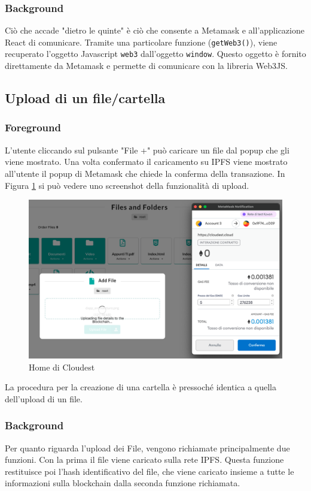\documentclass{article}
\begin{document}
\subsubsection{Background}
Ciò che accade "dietro le quinte" è ciò che consente a Metamask e all'applicazione React di comunicare. Tramite una particolare funzione (\texttt{getWeb3()}), viene recuperato l'oggetto Javascript \texttt{web3} dall'oggetto \texttt{window}. Questo oggetto è fornito direttamente da Metamask e permette di comunicare con la libreria Web3JS.

\subsection{Upload di un file/cartella}
\subsubsection{Foreground}
L'utente cliccando sul pulsante "File +" può caricare un file dal popup che gli viene mostrato. Una volta confermato il caricamento su IPFS viene mostrato all'utente il popup di Metamask che chiede la conferma della transazione. In Figura \ref{fig:fileupload} si può vedere uno screenshot della funzionalità di upload.

\begin{figure}[!ht]
  \includegraphics[width=14cm]{images/fileupload.png}
  \centering
  \caption{Home di Cloudest}
  \label{fig:fileupload}
\end{figure}

La procedura per la creazione di una cartella è pressoché identica a quella dell'upload di un file.

\subsubsection{Background}
Per quanto riguarda l'upload dei File, vengono richiamate principalmente due funzioni. Con la prima il file viene caricato sulla rete IPFS. Questa funzione restituisce poi l'hash identificativo del file, che viene caricato insieme a tutte le informazioni sulla blockchain dalla seconda funzione richiamata. 
\end{document}
